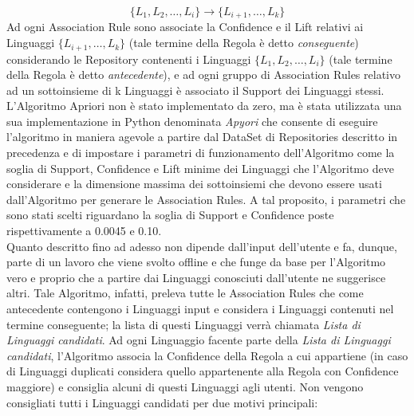 \begin{equation}
    \{L_1, L_2, \dots, L_i\} \rightarrow \{L_{i+1}, \dots, L_k\}
\end{equation}
Ad ogni Association Rule sono associate la Confidence e il Lift relativi ai Linguaggi $\{L_{i+1}, \dots, L_k\}$ (tale termine della Regola è detto \emph{conseguente}) considerando le Repository contenenti i Linguaggi $\{L_1, L_2, \dots, L_i\}$ (tale termine della Regola è detto \emph{antecedente}), e ad ogni gruppo di Association Rules relativo ad un sottoinsieme di k Linguaggi è associato il Support dei Linguaggi stessi.
L'Algoritmo Apriori non è stato implementato da zero, ma è stata utilizzata una sua implementazione in Python denominata \emph{Apyori} \cite{Apyori} che consente di eseguire l'algoritmo in maniera agevole a partire dal DataSet di Repositories descritto in precedenza e di impostare i parametri di funzionamento dell'Algoritmo come la soglia di Support, Confidence e Lift minime dei Linguaggi che l'Algoritmo deve considerare e la dimensione massima dei sottoinsiemi che devono essere usati dall'Algoritmo per generare le Association Rules. A tal proposito, i parametri che sono stati scelti riguardano la soglia di Support e Confidence poste rispettivamente a 0.0045 e 0.10.\\
Quanto descritto fino ad adesso non dipende dall'input dell'utente e fa, dunque, parte di un lavoro che viene svolto offline e che funge da base per l'Algoritmo vero e proprio che a partire dai Linguaggi conosciuti dall'utente ne suggerisce altri. Tale Algoritmo, infatti, preleva tutte le Association Rules che come antecedente contengono i Linguaggi input e considera i Linguaggi contenuti nel termine conseguente; la lista di questi Linguaggi verrà chiamata \emph{Lista di Linguaggi candidati}. Ad ogni Linguaggio facente parte della \emph{Lista di Linguaggi candidati}, l'Algoritmo associa la Confidence della Regola a cui appartiene (in caso di Linguaggi duplicati considera quello appartenente alla Regola con Confidence maggiore) e consiglia alcuni di questi Linguaggi agli utenti. Non vengono consigliati tutti i Linguaggi candidati per due motivi principali: 
